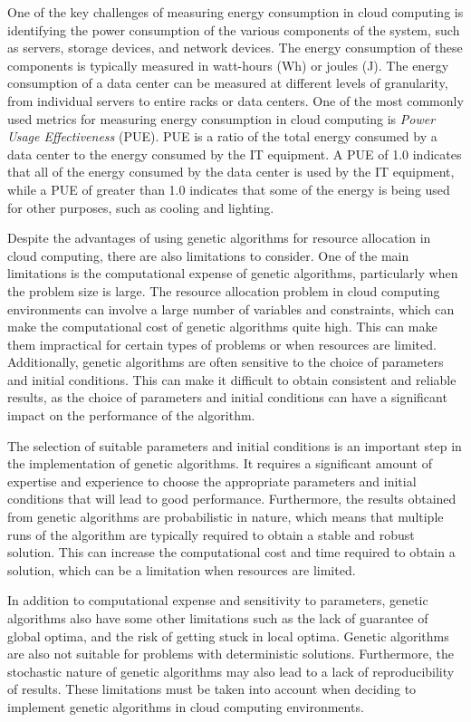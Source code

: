One of the key challenges of measuring energy consumption in cloud computing is identifying the power consumption of the various components of the system, 
such as servers, storage devices, and network devices. 
The energy consumption of these components is typically measured in watt-hours (Wh) or joules (J). 
The energy consumption of a data center can be measured at different levels of granularity, from individual servers to entire racks or data centers. 
One of the most commonly used metrics for measuring energy consumption in cloud computing is \textit{Power Usage Effectiveness} (PUE). 
PUE is a ratio of the total energy consumed by a data center to the energy consumed by the IT equipment. 
A PUE of 1.0 indicates that all of the energy consumed by the data center is used by the IT equipment, while a PUE of greater than 1.0 
indicates that some of the energy is being used for other purposes, such as cooling and lighting.~\cite{uchechukwu2014energy}

Despite the advantages of using genetic algorithms for resource allocation in cloud computing, there are also limitations to consider. 
One of the main limitations is the computational expense of genetic algorithms, particularly when the problem size is large. 
The resource allocation problem in cloud computing environments can involve a large number of variables and constraints, 
which can make the computational cost of genetic algorithms quite high. This can make them impractical for certain types of problems or when resources are limited. 
Additionally, genetic algorithms are often sensitive to the choice of parameters and initial conditions. This can make it difficult to obtain consistent and reliable results, 
as the choice of parameters and initial conditions can have a significant impact on the performance of the algorithm.~\cite{dillon2010cloud, sajid2013cloud}

The selection of suitable parameters and initial conditions is an important step in the implementation of genetic algorithms. 
It requires a significant amount of expertise and experience to choose the appropriate parameters and initial conditions that will lead to good performance. 
Furthermore, the results obtained from genetic algorithms are probabilistic in nature, which means that multiple runs of the algorithm are typically required 
to obtain a stable and robust solution. This can increase the computational cost and time required to obtain a solution, which can be a limitation when resources are limited.

In addition to computational expense and sensitivity to parameters, genetic algorithms also have some other limitations such as the lack of guarantee of global optima, 
and the risk of getting stuck in local optima. Genetic algorithms are also not suitable for problems with deterministic solutions. 
Furthermore, the stochastic nature of genetic algorithms may also lead to a lack of reproducibility of results. 
These limitations must be taken into account when deciding to implement genetic algorithms in cloud computing environments.

